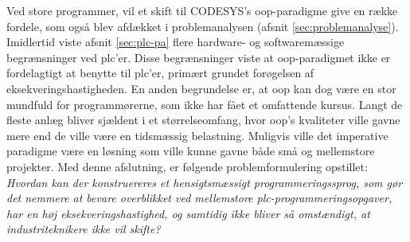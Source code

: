 \noindent Ved store programmer, vil et skift til CODESYS's \gls{oop}-paradigme give en række fordele, som også blev afdækket i problemanalysen (afsnit \ref{sec:problemanalyse}). Imidlertid viste afsnit \ref{sec:plc-pa} flere hardware- og softwaremæssige begrænsninger ved \gls{plc}'er. Disse begrænsninger viste at \gls{oop}-paradigmet ikke er fordelagtigt at benytte til \gls{plc}'er, primært grundet forøgelsen af eksekveringshastigheden. En anden begrundelse er, at \gls{oop} kan dog være en stor mundfuld for programmørerne, som ikke har fået et omfattende kursus. Langt de fleste anlæg bliver sjældent i et størrelseomfang, hvor \gls{oop}'s kvaliteter ville gavne mere end de ville være en tidsmæssig belastning. Muligvis ville det imperative paradigme være en løsning som ville kunne gavne både små og mellemstore projekter. Med denne afslutning, er følgende problemformulering opstillet: \\

\noindent\textit{Hvordan kan der konstruereres et hensigtsmæssigt programmeringssprog, som gør det nemmere at bevare overblikket ved mellemstore \gls{plc}-programmeringsopgaver, har en høj eksekveringshastighed, og samtidig ikke bliver så omstændigt, at industriteknikere ikke vil skifte?}





